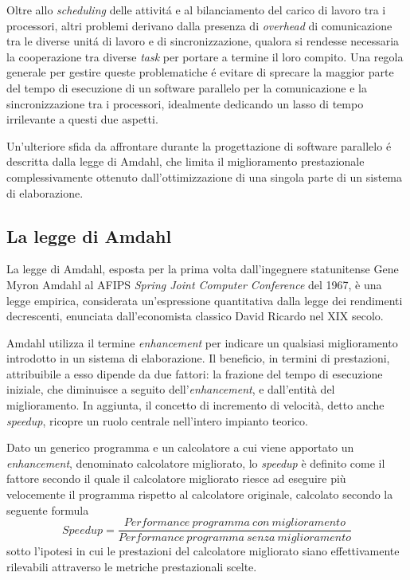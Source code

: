 Oltre allo \textit{scheduling} delle attivit\'a e al bilanciamento del carico di lavoro tra i processori, altri problemi derivano dalla presenza di
\textit{overhead} di comunicazione tra le diverse unit\'a di lavoro e di sincronizzazione, qualora si rendesse necessaria la cooperazione tra diverse
\textit{task} per portare a termine il loro compito.\newline
Una regola generale per gestire queste problematiche \'e evitare di sprecare la maggior parte del tempo di esecuzione di un software parallelo
per la comunicazione e la sincronizzazione tra i processori, idealmente dedicando un lasso di tempo irrilevante a questi due aspetti.

Un'ulteriore sfida da affrontare durante la progettazione di software parallelo \'e descritta dalla legge di
Amdahl, che limita il miglioramento prestazionale complessivamente ottenuto dall'ottimizzazione di una singola parte di un sistema di
elaborazione.
\subsection{La legge di Amdahl}
La legge di Amdahl, esposta per la prima volta dall’ingegnere statunitense Gene Myron Amdahl al AFIPS \textit{Spring Joint Computer
    Conference} del 1967, è una legge empirica, considerata un'espressione quantitativa dalla legge dei rendimenti decrescenti,
enunciata dall’economista classico David Ricardo nel XIX secolo.

Amdahl utilizza il termine \textit{enhancement} per indicare un qualsiasi miglioramento introdotto in un sistema di
elaborazione.\newline
Il beneficio, in termini di prestazioni, attribuibile a esso dipende da due fattori: la frazione del tempo di esecuzione iniziale,
che diminuisce a seguito dell'\textit{enhancement}, e dall'entità del miglioramento.\newline
In aggiunta, il concetto di incremento di velocità, detto anche \textit{speedup}, ricopre un ruolo centrale nell'intero impianto teorico.

Dato un generico programma e un calcolatore a cui viene apportato un \textit{enhancement}, denominato calcolatore migliorato,
lo \textit{speedup} è definito come il fattore secondo il quale il calcolatore migliorato riesce ad eseguire più
velocemente il programma rispetto al calcolatore originale, calcolato secondo la seguente formula
\[
    Speedup=\frac{Performance\ programma\ con\ miglioramento}{Performance\ programma\ senza\ miglioramento}
\]
sotto l’ipotesi in cui le prestazioni del calcolatore migliorato siano effettivamente rilevabili attraverso le metriche
prestazionali
scelte.

